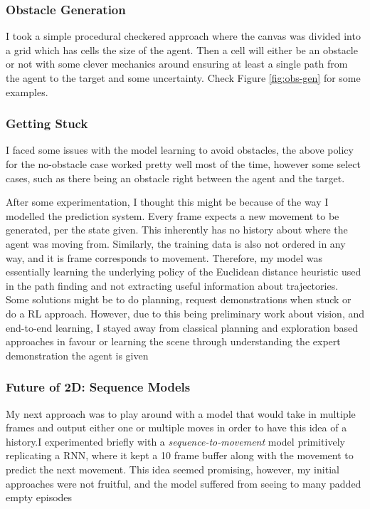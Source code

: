 \subsubsection{Obstacle Generation}
I took a simple procedural checkered approach where the canvas was divided into a grid which has cells the size of the agent. Then a cell will either be an obstacle or not with some clever mechanics around ensuring at least a single path from the agent to the target and some uncertainty. Check Figure \ref{fig:obs-gen} for some examples.

\subsubsection{Getting Stuck}
I faced some issues with the model learning to avoid obstacles, the above policy for the no-obstacle case worked pretty well most of the time, however some select cases, such as there being an obstacle right between the agent and the target. 

After some experimentation, I thought this might be because of the way I modelled the prediction system. Every frame expects a new movement to be generated, per the state given. This inherently has no history about where the agent was moving from. Similarly, the training data is also not ordered in any way, and it is frame corresponds to movement. Therefore, my model was essentially learning the underlying policy of the Euclidean distance heuristic used in the path finding and not extracting useful information about trajectories. Some solutions might be to do planning, request demonstrations when stuck or do a RL approach. However, due to this being preliminary work about vision, and end-to-end learning, I stayed away from classical planning and exploration based approaches in favour or learning the scene through understanding the expert demonstration the agent is given

\subsubsection{Future of 2D: Sequence Models}
My next approach was to play around with a model that would take in multiple frames and output either one or multiple moves in order to have this idea of a history.I experimented briefly with a \emph{sequence-to-movement} model primitively replicating a RNN, where it kept a 10 frame buffer along with the movement to predict the next movement. This idea seemed promising, however, my initial approaches were not fruitful, and the model suffered from seeing to many padded empty episodes
